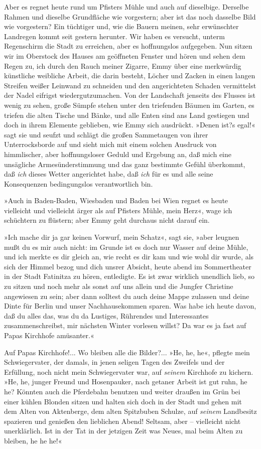 Aber es regnet heute rund um Pfisters Mühle und auch auf
dieselbige. Derselbe Rahmen und dieselbe Grundfläche wie
vorgestern; aber ist das noch dasselbe Bild wie vorgestern? Ein
tüchtiger und, wie die Bauern meinen, sehr erwünschter Landregen
kommt seit gestern herunter. Wir haben es versucht, unterm
Regenschirm die Stadt zu erreichen, aber es hoffnungslos
aufgegeben. Nun sitzen wir im Oberstock des Hauses am geöffneten
Fenster und hören und sehen dem Regen zu, ich durch den Rauch
meiner Zigarre, Emmy über eine merkwürdig künstliche weibliche
Arbeit, die darin besteht, Löcher und Zacken in einen langen
Streifen weißer Leinwand zu schneiden und den angerichteten Schaden
vermittelst der Nadel eifrigst wiedergutzumachen. Von der
Landschaft jenseits des Flusses ist wenig zu sehen, große Sümpfe
stehen unter den triefenden Bäumen im Garten, es triefen die alten
Tische und Bänke, und alle Enten sind ans Land gestiegen und doch
in ihrem Elemente geblieben, wie Emmy sich ausdrückt. »Denen ist?s
egal!« sagt sie und seufzt und schlägt die großen Sammetaugen von
ihrer Unterrocksborde auf und sieht mich mit einem solchen Ausdruck
von himmlischer, aber hoffnungsloser Geduld und Ergebung an, daß
mich eine unsägliche Armesünderstimmung und das ganz bestimmte
Gefühl überkommt, daß \emph{ich} dieses Wetter angerichtet habe,
daß \emph{ich} für es und alle seine Konsequenzen bedingungslos
verantwortlich bin.

»Auch in Baden-Baden, Wiesbaden und Baden bei Wien regnet es heute
vielleicht und vielleicht ärger als auf Pfisters Mühle, mein Herz«,
wage ich schüchtern zu flüstern; aber Emmy geht durchaus nicht
darauf ein.

»Ich mache dir ja gar keinen Vorwurf, mein Schatz«, sagt sie, »aber
leugnen mußt du es mir auch nicht: im Grunde ist es doch nur Wasser
auf deine Mühle, und ich merkte es dir gleich an, wie recht es dir
kam und wie wohl dir wurde, als sich der Himmel bezog und dich
unsrer Absicht, heute abend im Sommertheater in der Stadt Fatinitza
zu hören, entledigte. Es ist zwar wirklich unendlich lieb, so zu
sitzen und noch mehr als sonst auf uns allein und die Jungfer
Christine angewiesen zu sein; aber dann solltest du auch deine
Mappe zulassen und deine Dinte für Berlin und unser Nachhausekommen
sparen. Was habe ich heute davon, daß du alles das, was du da
Lustiges, Rührendes und Interessantes zusammenschreibst, mir
nächsten Winter vorlesen willst? Da war es ja fast auf Papas
Kirchhofe amüsanter.«

Auf Papas Kirchhofe!... Wo bleiben alle die Bilder?... »He, he,
he«, pflegte mein Schwiegervater, der damals, in jenen seligen
Tagen des Zweifels und der Erfüllung, noch nicht mein
Schwiegervater war, auf \emph{seinem} Kirchhofe zu kichern. »He,
he, junger Freund und Hosenpauker, nach getaner Arbeit ist gut
ruhn, he he? Könnten auch die Pferdebahn benutzen und weiter
draußen im Grün bei einer kühlen Blonden sitzen und halten sich
doch in der Stadt und gehen mit dem Alten von Aktenberge, dem alten
Spitzbuben Schulze, auf \emph{seinem} Landbesitz spazieren und
genießen den lieblichen Abend! Seltsam, aber – vielleicht nicht
unerklärlich. Ist in der Tat in der jetzigen Zeit was Neues, mal
beim Alten zu bleiben, he he he!«

